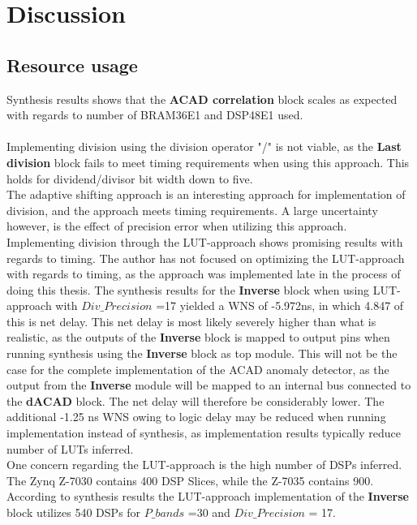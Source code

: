 \chapter{Discussion}
\label{sec:Discussion}

\section{Resource usage}
Synthesis results shows that the \textbf{ACAD correlation} block scales as expected with regards to number of BRAM36E1 and DSP48E1 used.\\


\\
 Implementing division using the division operator "/" is not viable, as the \textbf{Last division} block fails to meet timing requirements when using this approach. This holds for dividend/divisor bit width down to five. \\

The adaptive shifting approach is an interesting approach for implementation of division, and the approach meets timing requirements. A large uncertainty however, is the effect of precision error when utilizing this approach.\\ 


Implementing division through the LUT-approach shows promising results with regards to timing. The author has not focused on optimizing the LUT-approach with regards to timing, as the approach was implemented late in the process of doing this thesis. The synthesis results for the \textbf{Inverse} block when using LUT-approach with $Div\_Precision$ =17 yielded a WNS of -5.972ns, in which 4.847 of this is net delay. This net delay is most likely severely higher than what is realistic, as the outputs of the \textbf{Inverse} block is mapped to output pins when running synthesis using the \textbf{Inverse} block as top module. This will not be the case for the complete implementation of the ACAD anomaly detector, as the output from the \textbf{Inverse} module will be mapped to an internal bus connected to the \textbf{dACAD} block. The net delay will therefore be considerably lower.  The additional -1.25 ns WNS owing to logic delay may be reduced when running implementation instead of synthesis, as implementation results typically reduce number of LUTs inferred.  \\

One concern regarding the LUT-approach is the high number of DSPs inferred. The Zynq Z-7030 contains 400 DSP Slices, while the Z-7035 contains 900. According to synthesis results the LUT-approach implementation of the \textbf{Inverse} block utilizes 540 DSPs for $P\_bands$ =30 and $Div\_Precision$ = 17. \\



